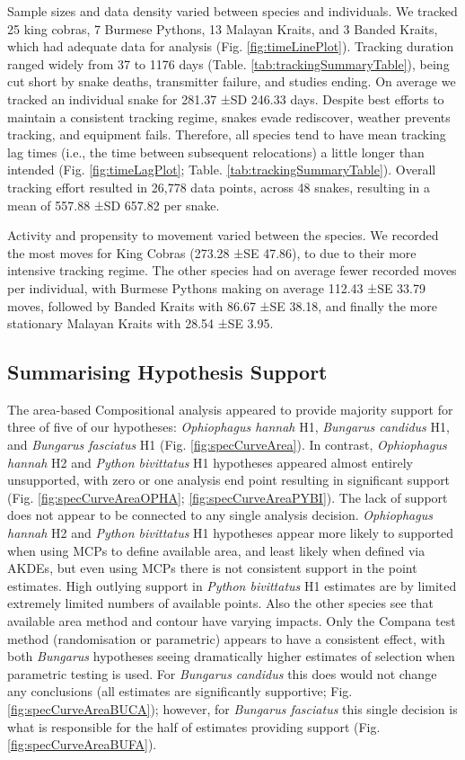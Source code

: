 \documentclass[10pt,a4paper]{article}
\begin{document}
Sample sizes and data density varied between species and individuals.
We tracked 25 king cobras, 7 Burmese Pythons, 13 Malayan Kraits, and 3 Banded Kraits, which had adequate data for analysis (Fig. \ref{fig:timeLinePlot}).
Tracking duration ranged widely from 37 to 1176 days (Table. \ref{tab:trackingSummaryTable}), being cut short by snake deaths, transmitter failure, and studies ending.
On average we tracked an individual snake for 281.37 ±SD 246.33 days.
Despite best efforts to maintain a consistent tracking regime, snakes evade rediscover, weather prevents tracking, and equipment fails.
Therefore, all species tend to have mean tracking lag times (i.e., the time between subsequent relocations) a little longer than intended (Fig. \ref{fig:timeLagPlot}; Table. \ref{tab:trackingSummaryTable}).
Overall tracking effort resulted in 26,778 data points, across 48 snakes, resulting in a mean of 557.88 ±SD 657.82 per snake.

Activity and propensity to movement varied between the species.
We recorded the most moves for King Cobras (273.28 ±SE 47.86), to due to their more intensive tracking regime.
The other species had on average fewer recorded moves per individual, with Burmese Pythons making on average 112.43 ±SE 33.79 moves, followed by Banded Kraits with 86.67 ±SE 38.18, and finally the more stationary Malayan Kraits with 28.54 ±SE 3.95.

\subsection{Summarising Hypothesis Support}\label{summarising-hypothesis-support}

The area-based Compositional analysis appeared to provide majority support for three of five of our hypotheses: \emph{Ophiophagus hannah} H1, \emph{Bungarus candidus} H1, and \emph{Bungarus fasciatus} H1 (Fig. \ref{fig:specCurveArea}).
In contrast, \emph{Ophiophagus hannah} H2 and \emph{Python bivittatus} H1 hypotheses appeared almost entirely unsupported, with zero or one analysis end point resulting in significant support (Fig. \ref{fig:specCurveAreaOPHA}; \ref{fig:specCurveAreaPYBI}).
The lack of support does not appear to be connected to any single analysis decision.
\emph{Ophiophagus hannah} H2 and \emph{Python bivittatus} H1 hypotheses appear more likely to supported when using MCPs to define available area, and least likely when defined via AKDEs, but even using MCPs there is not consistent support in the point estimates.
High outlying support in \emph{Python bivittatus} H1 estimates are by limited extremely limited numbers of available points.
Also the other species see that available area method and contour have varying impacts.
Only the Compana test method (randomisation or parametric) appears to have a consistent effect, with both \emph{Bungarus} hypotheses seeing dramatically higher estimates of selection when parametric testing is used.
For \emph{Bungarus candidus} this does would not change any conclusions (all estimates are significantly supportive; Fig. \ref{fig:specCurveAreaBUCA}); however, for \emph{Bungarus fasciatus} this single decision is what is responsible for the half of estimates providing support (Fig. \ref{fig:specCurveAreaBUFA}).
\end{document}

